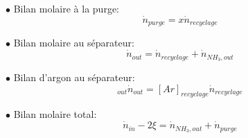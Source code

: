 \documentclass[a4paper, oneside, 12pt]{article}
\begin{document}
$\bullet$ Bilan molaire à la purge:
\begin{equation}
\dot{n}_{purge}=x \dot{n}_{recyclage}
\end{equation}

$\bullet$ Bilan molaire au séparateur:
\begin{equation}
\dot{n}_{out}=\dot{n}_{recyclage}+\dot{n}_{NH_3,out}
\end{equation}

$\bullet$ Bilan d'argon au séparateur:
\begin{equation}
[Ar]_{out} \dot{n}_{out}=[Ar]_{recyclage} \dot{n}_{recyclage}
\end{equation}

$\bullet$ Bilan molaire total:
\begin{equation}
\dot{n}_{in} - 2\xi=\dot{n}_{NH_3,out} + \dot{n}_{purge}
\end{equation}
\end{document}
